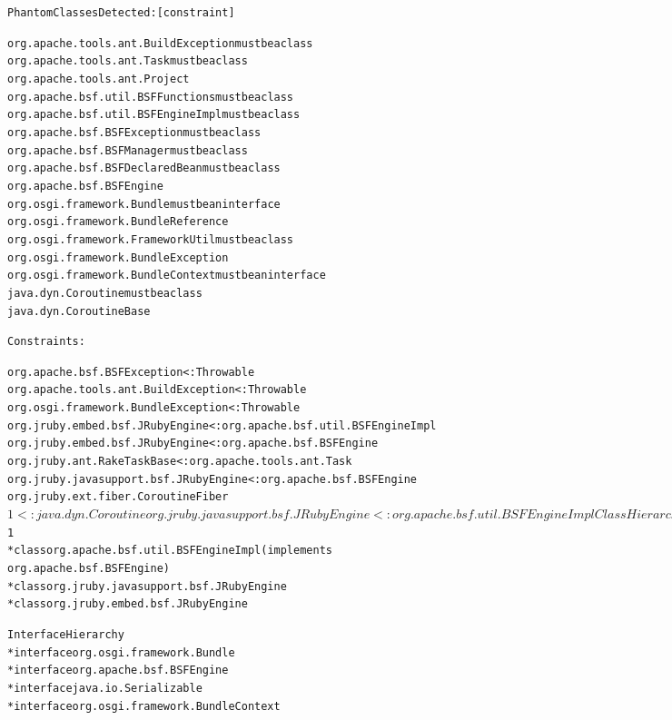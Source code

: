 \begin{alltt}\footnotesize
Phantom Classes Detected: \hfill{[constraint]}

org.apache.tools.ant.BuildException \hfill{must be a class}
org.apache.tools.ant.Task \hfill{must be a class}
org.apache.tools.ant.Project
org.apache.bsf.util.BSFFunctions \hfill{must be a class}
org.apache.bsf.util.BSFEngineImpl \hfill{must be a class}
org.apache.bsf.BSFException \hfill{must be a class}
org.apache.bsf.BSFManager \hfill{must be a class}
org.apache.bsf.BSFDeclaredBean \hfill{must be a class}
org.apache.bsf.BSFEngine
org.osgi.framework.Bundle \hfill{must be an interface}
org.osgi.framework.BundleReference
org.osgi.framework.FrameworkUtil \hfill{must be a class}
org.osgi.framework.BundleException
org.osgi.framework.BundleContext \hfill{must be an interface}
java.dyn.Coroutine \hfill{must be a class}
java.dyn.CoroutineBase

Constraints:

org.apache.bsf.BSFException <: Throwable
org.apache.tools.ant.BuildException <: Throwable
org.osgi.framework.BundleException <: Throwable
org.jruby.embed.bsf.JRubyEngine <: org.apache.bsf.util.BSFEngineImpl
org.jruby.embed.bsf.JRubyEngine <: org.apache.bsf.BSFEngine
org.jruby.ant.RakeTaskBase <: org.apache.tools.ant.Task
org.jruby.javasupport.bsf.JRubyEngine <: org.apache.bsf.BSFEngine
org.jruby.ext.fiber.CoroutineFiber$1 <: java.dyn.Coroutine
org.jruby.javasupport.bsf.JRubyEngine <: org.apache.bsf.util.BSFEngineImpl

Class Hierarchy
* class java.lang.Object
  * class org.apache.bsf.BSFManager
  * class org.osgi.framework.FrameworkUtil
  * class Throwable (implements java.io.Serializable)
    * class org.osgi.framework.BundleException
    * class org.apache.tools.ant.BuildException
    * class org.apache.bsf.BSFException
  * class org.apache.bsf.BSFDeclaredBean
  * class org.apache.bsf.util.BSFFunctions
  * class org.apache.tools.ant.Task
    * class org.jruby.ant.RakeTaskBase
  * class java.dyn.Coroutine
    * class org.jruby.ext.fiber.CoroutineFiber$1
  * class org.apache.bsf.util.BSFEngineImpl (implements
     org.apache.bsf.BSFEngine)
    * class org.jruby.javasupport.bsf.JRubyEngine
    * class org.jruby.embed.bsf.JRubyEngine

Interface Hierarchy
* interface org.osgi.framework.Bundle
* interface org.apache.bsf.BSFEngine
* interface java.io.Serializable
* interface org.osgi.framework.BundleContext
\end{alltt}

